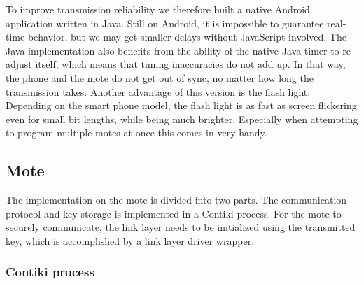 \documentclass{sig-alternate} %
\begin{document}
To improve transmission reliability we therefore built a native Android application written in Java.
Still on Android, it is impossible to guarantee real-time behavior, but we may get smaller delays without JavaScript involved.
The Java implementation also benefits from the ability of the native Java timer to re-adjust itself, which means that timing inaccuracies do not add up.
In that way, the phone and the mote do not get out of sync, no matter how long the transmission takes.
Another advantage of this version is the flash light.
Depending on the smart phone model, the flash light is as fast as screen flickering even for small bit lengths, while being much brighter.
Especially when attempting to program multiple motes at once this comes in very handy.


\subsection{Mote}
\label{sub:mote}

The implementation on the mote is divided into two parts.
The communication protocol and key storage is implemented in a Contiki process.
For the mote to securely communicate, the link layer needs to be initialized using the transmitted key, which is accomplished by a link layer driver wrapper.

\subsubsection{Contiki process}
\label{ssub:contiki_process}
\end{document}
